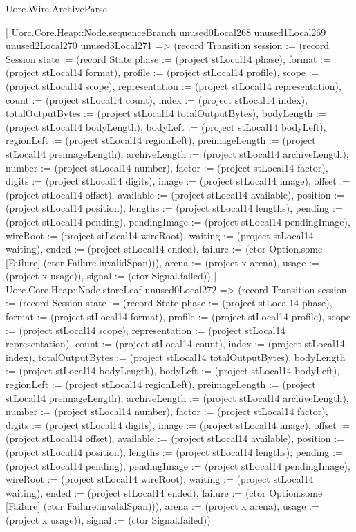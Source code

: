 \begin{lexlean}{Uorc.Wire.ArchiveParse}
\begin{semanticmodule}
{            | Uorc.Core.Heap::Node.sequenceBranch unused0Local268 unused1Local269 unused2Local270 unused3Local271 => (record Transition {session := (record Session {state := (record State {phase := (project stLocal14 phase), format := (project stLocal14 format), profile := (project stLocal14 profile), scope := (project stLocal14 scope), representation := (project stLocal14 representation), count := (project stLocal14 count), index := (project stLocal14 index), totalOutputBytes := (project stLocal14 totalOutputBytes), bodyLength := (project stLocal14 bodyLength), bodyLeft := (project stLocal14 bodyLeft), regionLeft := (project stLocal14 regionLeft), preimageLength := (project stLocal14 preimageLength), archiveLength := (project stLocal14 archiveLength), number := (project stLocal14 number), factor := (project stLocal14 factor), digits := (project stLocal14 digits), image := (project stLocal14 image), offset := (project stLocal14 offset), available := (project stLocal14 available), position := (project stLocal14 position), lengths := (project stLocal14 lengths), pending := (project stLocal14 pending), pendingImage := (project stLocal14 pendingImage), wireRoot := (project stLocal14 wireRoot), waiting := (project stLocal14 waiting), ended := (project stLocal14 ended), failure := (ctor Option.some [Failure] (ctor Failure.invalidSpan))}), arena := (project x arena), usage := (project x usage)}), signal := (ctor Signal.failed)})
            | Uorc.Core.Heap::Node.storeLeaf unused0Local272 => (record Transition {session := (record Session {state := (record State {phase := (project stLocal14 phase), format := (project stLocal14 format), profile := (project stLocal14 profile), scope := (project stLocal14 scope), representation := (project stLocal14 representation), count := (project stLocal14 count), index := (project stLocal14 index), totalOutputBytes := (project stLocal14 totalOutputBytes), bodyLength := (project stLocal14 bodyLength), bodyLeft := (project stLocal14 bodyLeft), regionLeft := (project stLocal14 regionLeft), preimageLength := (project stLocal14 preimageLength), archiveLength := (project stLocal14 archiveLength), number := (project stLocal14 number), factor := (project stLocal14 factor), digits := (project stLocal14 digits), image := (project stLocal14 image), offset := (project stLocal14 offset), available := (project stLocal14 available), position := (project stLocal14 position), lengths := (project stLocal14 lengths), pending := (project stLocal14 pending), pendingImage := (project stLocal14 pendingImage), wireRoot := (project stLocal14 wireRoot), waiting := (project stLocal14 waiting), ended := (project stLocal14 ended), failure := (ctor Option.some [Failure] (ctor Failure.invalidSpan))}), arena := (project x arena), usage := (project x usage)}), signal := (ctor Signal.failed)})
}
\end{semanticmodule}
\end{lexlean}
